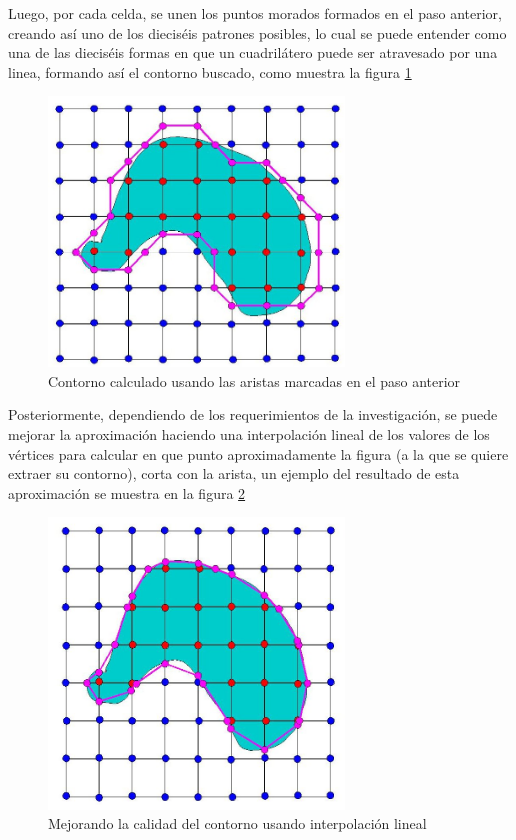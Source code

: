 Luego, por cada celda, se unen los puntos morados formados en el paso anterior, creando 
así uno de los dieciséis patrones posibles, lo cual se puede entender como una de las dieciséis 
formas en que un cuadrilátero puede ser atravesado por una linea, formando así el contorno 
buscado, como muestra la figura \ref{f:estadoDelArte:connectedobj}

\begin{figure}
\centering
	\includegraphics[width=0.7\textwidth]{images/marchingsquare/connectedobj.jpg}
\caption{Contorno calculado usando las aristas marcadas en el paso anterior}
\label{f:estadoDelArte:connectedobj}
\end{figure}

Posteriormente, dependiendo de los requerimientos de la investigación, se puede mejorar 
la aproximación haciendo una interpolación lineal de los valores de los vértices para calcular en 
que punto aproximadamente la figura (a la que se quiere extraer su contorno), corta con la arista, 
un ejemplo del resultado de esta aproximación se muestra en la figura \ref{f:estadoDelArte:2Dintersected}

\begin{figure}
\centering
	\includegraphics[width=0.7\textwidth]{images/marchingsquare/2Dintersected.jpg}
\caption{Mejorando la calidad del contorno usando interpolación lineal}
\label{f:estadoDelArte:2Dintersected}
\end{figure}

